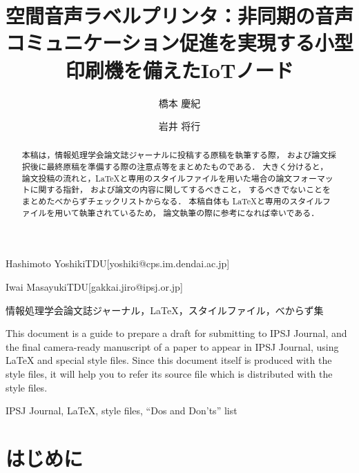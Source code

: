\documentclass[submit]{ipsj}
\begin{document}
\title{空間音声ラベルプリンタ：非同期の音声コミュニケーション促進を実現する小型印刷機を備えたIoTノード}





\author{橋本 慶紀}{Hashimoto Yoshiki}{TDU}[yoshiki@cps.im.dendai.ac.jp]
\author{岩井 将行}{Iwai Masayuki}{TDU}[gakkai.jiro@ipsj.or.jp]


\begin{abstract}
本稿は，情報処理学会論文誌ジャーナルに投稿する原稿を執筆する際，
および論文採択後に最終原稿を準備する際の注意点等をまとめたものである．
大きく分けると，
論文投稿の流れと，\LaTeX と専用のスタイルファイルを用いた場合の論文フォーマットに関する指針，
および論文の内容に関してするべきこと，
するべきでないことをまとめたべからずチェックリストからなる．
本稿自体も \LaTeX と専用のスタイルファイルを用いて執筆されているため，
論文執筆の際に参考になれば幸いである．
\end{abstract}


\begin{jkeyword}
情報処理学会論文誌ジャーナル，\LaTeX，スタイルファイル，べからず集
\end{jkeyword}

\begin{eabstract}
This document is a guide to prepare a draft for submitting to IPSJ
Journal, and the final camera-ready manuscript of a paper to appear in
IPSJ Journal, using {\LaTeX} and special style files.  Since this
document itself is produced with the style files, it will help you to
refer its source file which is distributed with the style files.
\end{eabstract}

\begin{ekeyword}
IPSJ Journal, \LaTeX, style files, ``Dos and Don'ts'' list
\end{ekeyword}

\maketitle

\section{はじめに}
\end{document}
